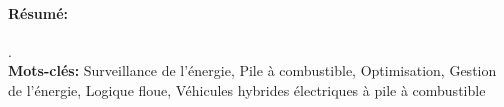 \begin{french}
\paragraph*{Résumé:} \lipsum[1].\\
	\textbf{Mots-clés: } Surveillance de l'énergie, Pile à combustible, Optimisation, Gestion de l'énergie, Logique floue, Véhicules hybrides électriques à pile à combustible 
	
\end{french}

\newpage

